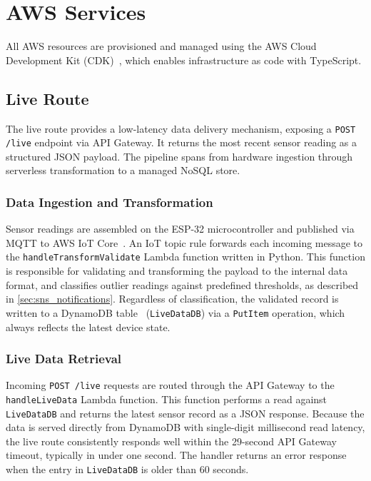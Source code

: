 \section{AWS Services}\label{sec:aws_services}

All AWS resources are provisioned and managed using the AWS Cloud Development Kit
(CDK)~\cite{aws-cdk}, which enables infrastructure as code with TypeScript.

\subsection{Live Route}\label{sec:live_route}
The live route provides a low-latency data delivery mechanism, exposing a
\texttt{POST /live} endpoint via API Gateway. It returns the most recent
sensor reading as a structured JSON payload. The pipeline spans from hardware
ingestion through serverless transformation to a managed NoSQL store.

\subsubsection{Data Ingestion and Transformation}
Sensor readings are assembled on the ESP-32 microcontroller and published
via MQTT to AWS IoT Core~\cite{awsIotCore}. An IoT topic rule
forwards each incoming message to the
\texttt{handleTransformValidate} Lambda function written in Python. This function is
responsible for validating and transforming the payload to the internal data format,
and classifies outlier readings against predefined thresholds, as described in
\cref{sec:sns_notifications}. Regardless of classification,
the validated record is written to a DynamoDB
table~\cite{aws-dynamodb} (\texttt{LiveDataDB}) via a \texttt{PutItem}
operation, which always reflects the latest device state.

\subsubsection{Live Data Retrieval}
Incoming \texttt{POST /live} requests are routed through the API Gateway to the
\texttt{handleLiveData} Lambda function. This function performs a read
against \texttt{LiveDataDB} and returns the latest sensor record as a
JSON response. Because the data is served directly from DynamoDB with
single-digit millisecond read latency, the live route consistently
responds well within the 29-second API Gateway timeout, typically in
under one second. The handler returns an error response when the entry in
\texttt{LiveDataDB} is older than 60 seconds.

